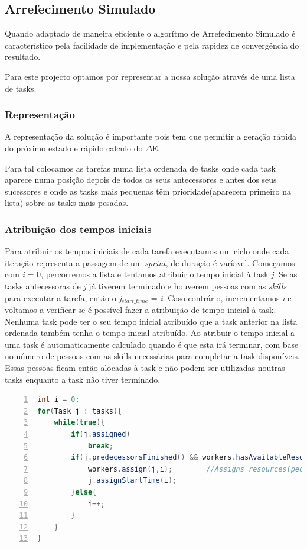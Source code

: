 \begin{titlepage}
\subsection{Arrefecimento Simulado} \cite{Arrefecimento}
\justify\normalsize

Quando adaptado de maneira eficiente o algorítmo de Arrefecimento Simulado é característico pela facilidade de implementação e pela rapidez de convergência do resultado.

Para este projecto optamos por representar a nossa solução através de uma lista de tasks.

\subsubsection{Representação}
A representação da solução é importante pois tem que permitir a geração rápida do próximo estado e rápido calculo do 	$\Delta$E.

Para tal colocamos as tarefas numa lista ordenada de tasks onde cada task aparece numa posição depois de todos os seus antecessores e antes dos seus sucessores e onde as tasks mais pequenas têm prioridade(aparecem primeiro na lista) sobre as tasks mais pesadas.

\subsubsection{Atribuição dos tempos iniciais}
Para atribuir os tempos iniciais de cada tarefa executamos um ciclo onde cada iteração representa a passagem de um \textit{sprint}, de duração é varíavel. Começamos com \textit{i} = 0, percorremos a lista e tentamos atribuir o tempo inicial à task \textit{j}. Se as tasks antecessoras de \textit{j} já tiverem terminado e houverem pessoas com as \textit{skills} para executar a tarefa, então o \textit{j}$_{start\_time}$ = \textit{i}. Caso contrário, incrementamos \textit{i} e voltamos a verificar se é possível fazer a atribuição de tempo inicial à task. Nenhuma task pode ter o seu tempo inicial atribuído que a task anterior na lista ordenada também tenha o tempo inicial atribuído. Ao atribuir o tempo inicial a uma task é automaticamente calculado quando é que esta irá terminar, com base no número de pessoas com as skills necessárias para completar a task disponíveis. Essas pessoas ficam então alocadas à task e não podem ser utilizadas noutras tasks enquanto a task não tiver terminado.

\begin{lstlisting}[frame=single, language=java,numbers=left,numberfirstline=true]  
int i = 0;
for(Task j : tasks){
	while(true){
		if(j.assigned)
			break;
		if(j.predecessorsFinished() && workers.hasAvailableResources(j)){
			workers.assign(j,i);		//Assigns resources(people) to the task j from i until the end of the task
			j.assignStartTime(i);
		}else{
			i++;
		}
	}	
}
\end{lstlisting}


\end{titlepage}
